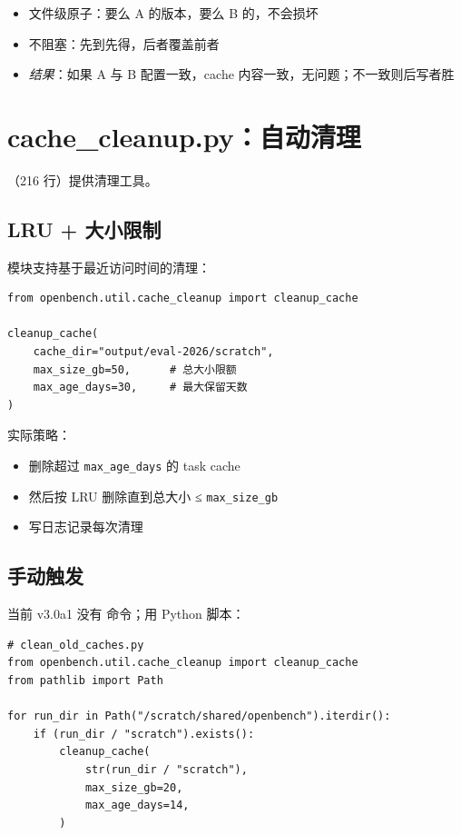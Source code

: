 \begin{itemize}
  \item 文件级原子：要么 A 的版本，要么 B 的，不会损坏
  \item 不阻塞：先到先得，后者覆盖前者
  \item \emph{结果}：如果 A 与 B 配置一致，cache 内容一致，无问题；不一致则后写者胜
\end{itemize}

\section{cache\_cleanup.py：自动清理}

（216 行）提供清理工具。

\subsection{LRU + 大小限制}

模块支持基于最近访问时间的清理：

\begin{verbatim}
from openbench.util.cache_cleanup import cleanup_cache

cleanup_cache(
    cache_dir="output/eval-2026/scratch",
    max_size_gb=50,      # 总大小限额
    max_age_days=30,     # 最大保留天数
)
\end{verbatim}

实际策略：

\begin{itemize}
  \item 删除超过 \texttt{max\_age\_days} 的 task cache
  \item 然后按 LRU 删除直到总大小 ≤ \texttt{max\_size\_gb}
  \item 写日志记录每次清理
\end{itemize}

\subsection{手动触发}

当前 v3.0a1 没有  命令；用 Python 脚本：

\begin{verbatim}
# clean_old_caches.py
from openbench.util.cache_cleanup import cleanup_cache
from pathlib import Path

for run_dir in Path("/scratch/shared/openbench").iterdir():
    if (run_dir / "scratch").exists():
        cleanup_cache(
            str(run_dir / "scratch"),
            max_size_gb=20,
            max_age_days=14,
        )
\end{verbatim}

